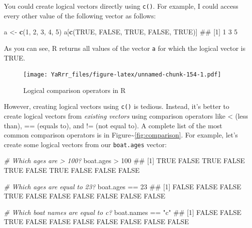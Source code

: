 \documentclass[]{book}
\newenvironment{Shaded}{\begin{snugshade}}{\end{snugshade}}
\newcommand{\KeywordTok}[1]{\textcolor[rgb]{0.13,0.29,0.53}{\textbf{{#1}}}}
\newcommand{\DecValTok}[1]{\textcolor[rgb]{0.00,0.00,0.81}{{#1}}}
\newcommand{\StringTok}[1]{\textcolor[rgb]{0.31,0.60,0.02}{{#1}}}
\newcommand{\CommentTok}[1]{\textcolor[rgb]{0.56,0.35,0.01}{\textit{{#1}}}}
\newcommand{\OtherTok}[1]{\textcolor[rgb]{0.56,0.35,0.01}{{#1}}}
\newcommand{\NormalTok}[1]{{#1}}
\theoremstyle{definition}
\theoremstyle{definition}
\theoremstyle{remark}
\begin{document}
You could create logical vectors directly using \texttt{c()}. For
example, I could access every other value of the following vector as
follows:

\begin{Shaded}
\begin{Highlighting}[]
\NormalTok{a <-}\StringTok{ }\KeywordTok{c}\NormalTok{(}\DecValTok{1}\NormalTok{, }\DecValTok{2}\NormalTok{, }\DecValTok{3}\NormalTok{, }\DecValTok{4}\NormalTok{, }\DecValTok{5}\NormalTok{)}
\NormalTok{a[}\KeywordTok{c}\NormalTok{(}\OtherTok{TRUE}\NormalTok{, }\OtherTok{FALSE}\NormalTok{, }\OtherTok{TRUE}\NormalTok{, }\OtherTok{FALSE}\NormalTok{, }\OtherTok{TRUE}\NormalTok{)]}
\NormalTok{## [1] 1 3 5}
\end{Highlighting}
\end{Shaded}

As you can see, R returns all values of the vector \texttt{a} for which
the logical vector is TRUE.

\begin{figure}[htbp]
\centering
\texttt{[image: YaRrr\_files/figure-latex/unnamed-chunk-154-1.pdf]}
\caption{\label{fig:unnamed-chunk-154}Logical comparison operators in R}
\end{figure}

However, creating logical vectors using \texttt{c()} is tedious.
Instead, it's better to create logical vectors from \emph{existing
vectors} using comparison operators like \textless{} (less than), ==
(equals to), and != (not equal to). A complete list of the most common
comparison operators is in Figure\textasciitilde{}\ref{fig:comparison}.
For example, let's create some logical vectors from our
\texttt{boat.ages} vector:

\begin{Shaded}
\begin{Highlighting}[]
\CommentTok{# Which ages are > 100?}
\NormalTok{boat.ages >}\StringTok{ }\DecValTok{100}
\NormalTok{##  [1]  TRUE FALSE  TRUE FALSE  TRUE FALSE  TRUE FALSE FALSE FALSE}

\CommentTok{# Which ages are equal to 23?}
\NormalTok{boat.ages ==}\StringTok{ }\DecValTok{23}
\NormalTok{##  [1] FALSE FALSE FALSE  TRUE FALSE FALSE FALSE FALSE FALSE FALSE}

\CommentTok{# Which boat names are equal to c?}
\NormalTok{boat.names ==}\StringTok{ "c"}
\NormalTok{##  [1] FALSE FALSE  TRUE FALSE FALSE FALSE FALSE FALSE FALSE FALSE}
\end{Highlighting}
\end{Shaded}
\end{document}

